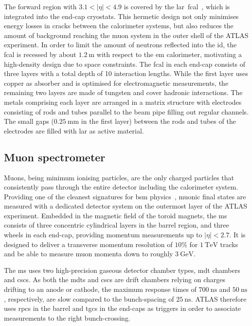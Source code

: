 The forward region with $3.1 < \vert\eta\vert <4.9$ is covered by the \gls{lar}~\gls{fcal}~\cite{Aad:2008zzm}, which is integrated into the end-cap cryostats.
This hermetic design not only minimises energy losses in cracks between the calorimeter systems, but also reduces the amount of background reaching the muon system in the outer shell of the ATLAS experiment.
In order to limit the amount of neutrons reflected into the \gls{id}, the \gls{fcal} is recessed by about $\SI{1.2}{\meter}$ with respect to the \gls{em} calorimeter, motivating a high-density design due to space constraints.
The \gls{fcal} in each end-cap consists of three layers with a total depth of 10 interaction lengths. 
While the first layer uses copper as absorber and is optimised for electromagnetic measurements, the remaining two layers are made of tungsten and cover hadronic interactions.
The metals comprising each layer are arranged in a matrix structure with electrodes consisting of rods and tubes parallel to the beam pipe filling out regular channels.
The small gaps ($\SI{0.25}{\milli\meter}$ in the first layer) between the rods and tubes of the electrodes are filled with \gls{lar} as active material.

\subsection{Muon spectrometer}

Muons, being minimum ionising particles, are the only charged particles that consistently pass through the entire detector including the calorimeter system. Providing one of the cleanest signatures for \gls{bsm} physics~\cite{Brock:1354959}, muonic final states are measured with a dedicated detector system on the outermost layer of the ATLAS experiment. Embedded in the magnetic field of the toroid magnets, the \gls{ms}~\cite{Aad:2008zzm} consists of three concentric cylindrical layers in the barrel region, and three wheels in each end-cap, providing momentum measurements up to $\vert\eta\vert <2.7$. It is designed to deliver a transverse momentum resolution of $10\%$ for $\SI{1}{\TeV}$ tracks and be able to measure muon momenta down to roughly $\SI{3}{\GeV}$.

The \gls{ms} uses two high-precision gaseous detector chamber types, \gls{mdt} chambers and \glspl{csc}. As both the \glspl{mdt} and \glspl{csc} are drift chambers relying on charges drifting to an anode or cathode, the maximum response times of $\SI{700}{\nano\second}$ and $\SI{50}{\nano\second}$, respectively, are slow compared to the bunch-spacing of $\SI{25}{\nano\second}$. ATLAS therefore uses \glspl{rpc} in the barrel and \glspl{tgc} in the end-caps as triggers in order to associate measurements to the right bunch-crossing.  


